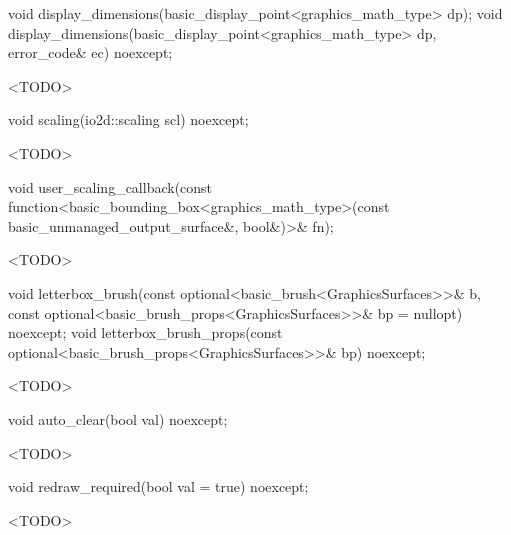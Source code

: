 %
\begin{itemdecl}
void display_dimensions(basic_display_point<graphics_math_type> dp);
void display_dimensions(basic_display_point<graphics_math_type> dp, error_code& ec) noexcept;
\end{itemdecl}
\begin{itemdescr}
\pnum
\effects
<TODO>
\end{itemdescr}

%
\begin{itemdecl}
void scaling(io2d::scaling scl) noexcept;
\end{itemdecl}
\begin{itemdescr}
\pnum
\effects
<TODO>
\end{itemdescr}

%
\begin{itemdecl}
void user_scaling_callback(const
  function<basic_bounding_box<graphics_math_type>(const
  basic_unmanaged_output_surface&, bool&)>& fn);
\end{itemdecl}
\begin{itemdescr}
\pnum
\effects
<TODO>
\end{itemdescr}

%
\begin{itemdecl}
void letterbox_brush(const optional<basic_brush<GraphicsSurfaces>>& b,
  const optional<basic_brush_props<GraphicsSurfaces>>& bp = nullopt) noexcept;
void letterbox_brush_props(const optional<basic_brush_props<GraphicsSurfaces>>& bp) noexcept;
\end{itemdecl}
\begin{itemdescr}
\pnum
\effects
<TODO>
\end{itemdescr}

%
\begin{itemdecl}
void auto_clear(bool val) noexcept;
\end{itemdecl}
\begin{itemdescr}
\pnum
\effects
<TODO>
\end{itemdescr}

%
\begin{itemdecl}
void redraw_required(bool val = true) noexcept;
\end{itemdecl}
\begin{itemdescr}
\pnum
\effects
<TODO>
\end{itemdescr}